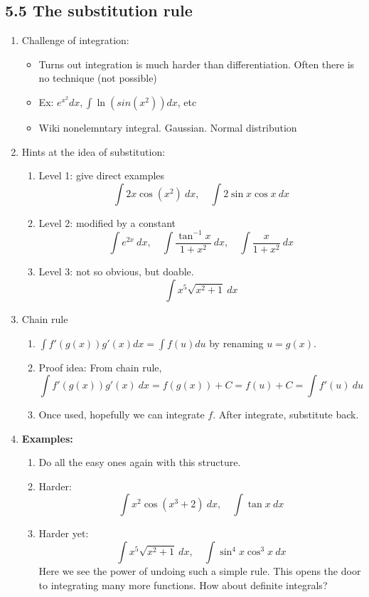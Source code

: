 \documentclass{article}
\begin{document}
\subsection{5.5 The substitution rule}
\begin{enumerate}

\item Challenge of integration:
\begin{itemize}
\item Turns out integration is much harder than differentiation. Often there is no technique (not possible)
\item Ex: $e^{x^2} dx, \int \ln(sin(x^2)) dx$, etc
\item Wiki nonelemntary integral. Gaussian. Normal distribution
\end{itemize}

\item Hints at the idea of substitution:
\begin{enumerate}
\item Level 1: give direct examples
$$
\int 2x\cos(x^2)~dx,\quad \int 2\sin x\cos x~dx
$$
\item Level 2: modified by a constant
$$
\int e^{2x}~dx,\quad\int \frac{\tan^{-1} x}{1+x^2}~dx, \quad \int \frac{x}{1+x^2}~dx
$$
\item Level 3: not so obvious, but doable.
$$
\int x^5\sqrt{x^2+1}~dx
$$
\end{enumerate}

\item Chain rule
\begin{enumerate}
\item $\int f'(g(x)) g'(x) dx = \int f(u) du$ by renaming $u = g(x)$.
\item Proof idea: From chain rule, 
\[
\int f'(g(x))g'(x) ~dx = f(g(x))+C = f(u)+C = \int f'(u) ~du
\]
\item Once used, hopefully we can integrate $f$. After integrate, substitute back.
\end{enumerate}

\item {\bf Examples:}
\begin{enumerate}
\item Do all the easy ones again with this structure.
\item Harder:
$$
\int x^2\cos(x^3+2)~dx,\quad \int \tan x~dx
$$
\item Harder yet:
$$
\int x^5\sqrt{x^2+1}~dx,\quad\int \sin^4x\cos^3x~dx
$$
Here we see the power of undoing such a simple rule. This opens the door to integrating many more functions. How about definite integrals?
\end{enumerate}


\end{enumerate}
\end{document}
